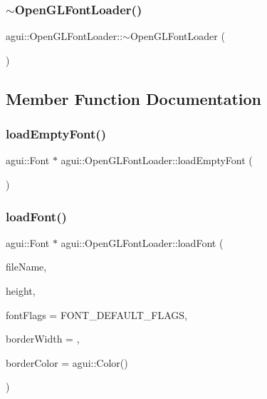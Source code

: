 \subsubsection{\texorpdfstring{$\sim$\+Open\+G\+L\+Font\+Loader()}{~OpenGLFontLoader()}}
{\footnotesize\ttfamily agui\+::\+Open\+G\+L\+Font\+Loader\+::$\sim$\+Open\+G\+L\+Font\+Loader (\begin{DoxyParamCaption}{ }\end{DoxyParamCaption})\hspace{0.3cm}{\ttfamily [default]}}



\subsection{Member Function Documentation}
\mbox{\label{classagui_1_1_open_g_l_font_loader_af11760c16e9f88ee6c534a914897096e}} 
\subsubsection{\texorpdfstring{load\+Empty\+Font()}{loadEmptyFont()}}
{\footnotesize\ttfamily agui\+::\+Font $\ast$ agui\+::\+Open\+G\+L\+Font\+Loader\+::load\+Empty\+Font (\begin{DoxyParamCaption}{ }\end{DoxyParamCaption})\hspace{0.3cm}{\ttfamily [override]}}

\mbox{\label{classagui_1_1_open_g_l_font_loader_a6f90ac8ad2a2d11c6423d5c9559e3f65}} 
\subsubsection{\texorpdfstring{load\+Font()}{loadFont()}}
{\footnotesize\ttfamily agui\+::\+Font $\ast$ agui\+::\+Open\+G\+L\+Font\+Loader\+::load\+Font (\begin{DoxyParamCaption}\item[{const std\+::string \&}]{file\+Name,  }\item[{int}]{height,  }\item[{Font\+Flags}]{font\+Flags = {\ttfamily FONT\+\_\+DEFAULT\+\_\+FLAGS},  }\item[{float}]{border\+Width = {},  }\item[{agui\+::\+Color}]{border\+Color = {\ttfamily agui\+:\+:Color()} }\end{DoxyParamCaption})\hspace{0.3cm}{\ttfamily [override]}}



